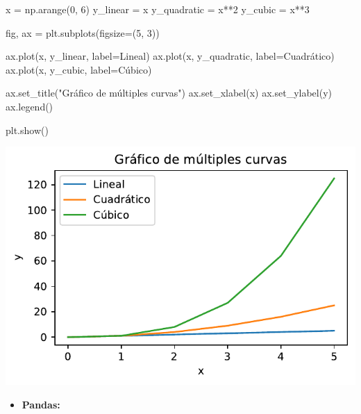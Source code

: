 \documentclass[
  letterpaper,
  DIV=11,
  numbers=noendperiod]{scrreprt}
\newenvironment{Shaded}{\begin{snugshade}}{\end{snugshade}}
\newcommand{\DecValTok}[1]{\textcolor[rgb]{0.68,0.00,0.00}{#1}}
\newcommand{\NormalTok}[1]{\textcolor[rgb]{0.00,0.23,0.31}{#1}}
\newcommand{\OperatorTok}[1]{\textcolor[rgb]{0.37,0.37,0.37}{#1}}
\newcommand{\StringTok}[1]{\textcolor[rgb]{0.13,0.47,0.30}{#1}}
\providecommand{\tightlist}{%
  \setlength{\itemsep}{0pt}\setlength{\parskip}{0pt}}\usepackage{longtable,booktabs,array}
\begin{document}
\begin{Shaded}
\begin{Highlighting}[]
\NormalTok{x }\OperatorTok{=}\NormalTok{ np.arange(}\DecValTok{0}\NormalTok{, }\DecValTok{6}\NormalTok{)}
\NormalTok{y\_linear }\OperatorTok{=}\NormalTok{ x}
\NormalTok{y\_quadratic }\OperatorTok{=}\NormalTok{ x}\OperatorTok{**}\DecValTok{2}
\NormalTok{y\_cubic }\OperatorTok{=}\NormalTok{ x}\OperatorTok{**}\DecValTok{3}

\NormalTok{fig, ax }\OperatorTok{=}\NormalTok{ plt.subplots(figsize}\OperatorTok{=}\NormalTok{(}\DecValTok{5}\NormalTok{, }\DecValTok{3}\NormalTok{))}

\NormalTok{ax.plot(x, y\_linear, label}\OperatorTok{=}\StringTok{\textquotesingle{}Lineal\textquotesingle{}}\NormalTok{)}
\NormalTok{ax.plot(x, y\_quadratic, label}\OperatorTok{=}\StringTok{\textquotesingle{}Cuadrático\textquotesingle{}}\NormalTok{)}
\NormalTok{ax.plot(x, y\_cubic, label}\OperatorTok{=}\StringTok{\textquotesingle{}Cúbico\textquotesingle{}}\NormalTok{)}

\NormalTok{ax.set\_title(}\StringTok{"Gráfico de múltiples curvas"}\NormalTok{)}
\NormalTok{ax.set\_xlabel(}\StringTok{\textquotesingle{}x\textquotesingle{}}\NormalTok{)}
\NormalTok{ax.set\_ylabel(}\StringTok{\textquotesingle{}y\textquotesingle{}}\NormalTok{)}
\NormalTok{ax.legend()}

\NormalTok{plt.show()}
\end{Highlighting}
\end{Shaded}

\includegraphics{unidad_6_files/figure-pdf/cell-130-output-1.pdf}

\begin{itemize}
\tightlist
\item
  \textbf{Pandas:}
\end{itemize}
\end{document}
